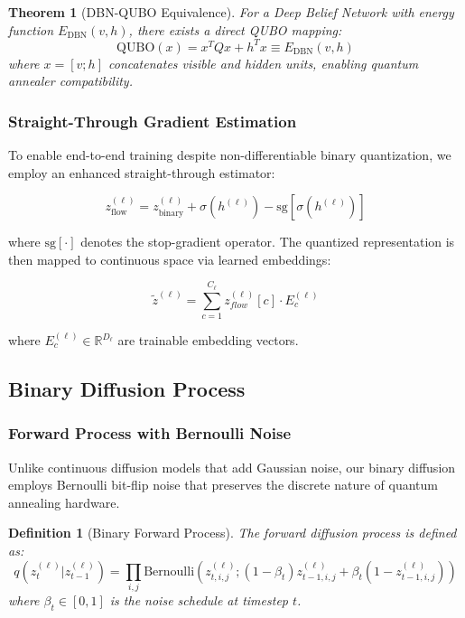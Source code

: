 \documentclass{article}
\newtheorem{theorem}{Theorem}
\newtheorem{definition}{Definition}
\begin{document}
\begin{theorem}[DBN-QUBO Equivalence]
For a Deep Belief Network with energy function $E_{\text{DBN}}(v,h)$, there exists a direct QUBO mapping:
\begin{equation}
\text{QUBO}(x) = x^T Q x + h^T x \equiv E_{\text{DBN}}(v,h)
\end{equation}
where $x = [v; h]$ concatenates visible and hidden units, enabling quantum annealer compatibility.
\end{theorem}

\subsubsection{Straight-Through Gradient Estimation}

To enable end-to-end training despite non-differentiable binary quantization, we employ an enhanced straight-through estimator:

\begin{equation}
z^{(\ell)}_{\text{flow}} = z^{(\ell)}_{\text{binary}} + \sigma(h^{(\ell)}) - \text{sg}[\sigma(h^{(\ell)})]
\end{equation}

where $\text{sg}[\cdot]$ denotes the stop-gradient operator. The quantized representation is then mapped to continuous space via learned embeddings:

\begin{equation}
\tilde{z}^{(\ell)} = \sum_{c=1}^{C_\ell} z^{(\ell)}_{flow}[c] \cdot E^{(\ell)}_c
\end{equation}

where $E^{(\ell)}_c \in \mathbb{R}^{D_\ell}$ are trainable embedding vectors.

\subsection{Binary Diffusion Process}

\subsubsection{Forward Process with Bernoulli Noise}

Unlike continuous diffusion models that add Gaussian noise, our binary diffusion employs Bernoulli bit-flip noise that preserves the discrete nature of quantum annealing hardware.

\begin{definition}[Binary Forward Process]
The forward diffusion process is defined as:
\begin{equation}
q(z_t^{(\ell)} | z_{t-1}^{(\ell)}) = \prod_{i,j} \text{Bernoulli}\left(z_{t,i,j}^{(\ell)}; (1-\beta_t) z_{t-1,i,j}^{(\ell)} + \beta_t (1-z_{t-1,i,j}^{(\ell)})\right)
\end{equation}
where $\beta_t \in [0,1]$ is the noise schedule at timestep $t$.
\end{definition}
\end{document}
